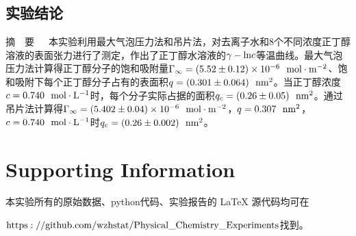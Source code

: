 \documentclass[12pt]{article}
\begin{document}
		\subsection{实验结论}
		\textsf{\textcolor{BrickRed}{摘\ \ 要}}\ \  \  本实验利用最大气泡压力法和吊片法，对去离子水和8个不同浓度正丁醇溶液的表面张力进行了测定，作出了正丁醇水溶液的$\gamma-{\rm ln}c$等温曲线。最大气泡压力法计算得正丁醇分子的饱和吸附量$\Gamma_{\infty}=(5.52\pm 0.12)\times 10^{-6}\ \ {\rm mol\cdot m^{-2}}$、饱和吸附下每个正丁醇分子占有的表面积$q=(0.301\pm 0.064)\ \ {\rm nm^{2}}$。当正丁醇浓度$c=0.740\ \ {\rm mol\cdot L^{-1}}$时，每个分子实际占据的面积$q_{c}=(0.26\pm 0.05)\ \ {\rm nm^{2}}$。通过吊片法计算得$\Gamma_{\infty}=(5.402\pm 0.04)\times10^{-6}\ \ {\rm mol\cdot m^{-2}}$，$q=0.307\ \ {\rm nm^{2}}$，$c=0.740\ \ {\rm mol\cdot L^{-1}}$时$q_{c}=(0.26\pm 0.002)\ \ {\rm nm^{2}}$。


		



	\vbox{}
	\section{Supporting Information}
		本实验所有的原始数据、python代码、实验报告的 LaTeX 源代码均可在\par
		 $\rm{https://github.com/wzhstat/Physical\_Chemistry\_Experiments}$找到。
\vbox{}  


\end{document}
